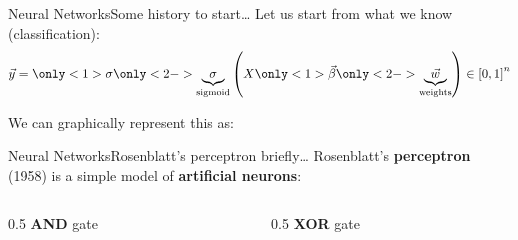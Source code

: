 \begin{frame}{Neural Networks}{Some history to start\dots}
    Let us start from what we know (classification):
    \begin{equation*}
        \vec{y}
        =
        \only<1>{\sigma}
        \only<2->{\underbrace{\sigma}_{\text{sigmoid}}}
        \left(
        X
        \only<1>{\vec{\beta}}
        \only<2->{\underbrace{\vec{w}}_{\text{weights}}}
        \right) \in \left[ 0, 1 \right]^n
    \end{equation*}

    \vfill \pause

    We can graphically represent this as:

    \begin{center}
        
    \end{center}
\end{frame}

\begin{frame}{Neural Networks}{Rosenblatt's perceptron briefly\dots}
    Rosenblatt's \textbf{perceptron} (1958) is a simple model of \textbf{artificial neurons}:

    \vfill

    \begin{columns}[c]
        \begin{column}{0.5\textwidth}
            \centering
            {\large \textbf{AND} gate} \\[1em]
             \\
        \end{column}
        \hfil
        \begin{column}{0.5\textwidth}
            \centering
            {\large \textbf{XOR} gate} \\[1em]
             \\
        \end{column}
    \end{columns}
\end{frame}

